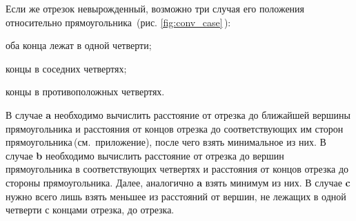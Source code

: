 Если же отрезок невырожденный, возможно три случая его положения относительно прямоугольника~(рис. \ref{fig:conv_case}\,):
\begin{list}{a}{}
\item[\textbf{a})] оба конца лежат в одной четверти;
\item[\textbf{b})] концы в соседних четвертях;
\item[\textbf{c})] концы в противоположных четвертях.
\end{list}
В случае \textbf{a} необходимо вычислить расстояние от отрезка до ближайшей вершины прямоугольника и расстояния от концов отрезка до соответствующих им сторон прямоугольника\,(см.~приложение), после чего взять минимальное из них.
В случае \textbf{b} необходимо вычислить расстояние от отрезка до вершин прямоугольника в соответствующих четвертях и расстояния от концов отрезка до стороны прямоугольника. Далее, аналогично \textbf{a} взять минимум из них.
В случае \textbf{c} нужно всего лишь взять меньшее из расстояний от вершин, не лежащих в одной четверти с концами отрезка, до отрезка.
